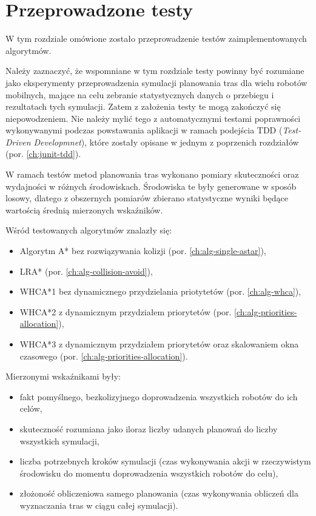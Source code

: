 \chapter{Przeprowadzone testy}
\label{ch:tests}
W tym rozdziale omówione zostało przeprowadzenie testów zaimplementowanych algorytmów.

Należy zaznaczyć, że wspomniane w tym rozdziale testy powinny być rozumiane jako eksperymenty przeprowadzenia symulacji planowania tras dla wielu robotów mobilnych, mające na celu zebranie statystycznych danych o przebiegu i rezultatach tych symulacji. Zatem z założenia testy te mogą zakończyć się niepowodzeniem.
Nie należy mylić tego z automatycznymi testami poprawności wykonywanymi podczas powstawania aplikacji w ramach podejścia TDD ({\it Test-Driven Developmnet}), które zostały opisane w jednym z poprzenich rozdziałów (por. \ref{ch:junit-tdd}).

W ramach testów metod planowania tras wykonano pomiary skuteczności oraz wydajności w różnych środowiskach. 
Środowiska te były generowane w sposób losowy, dlatego z obszernych pomiarów zbierano statystyczne wyniki będące wartością średnią mierzonych wskaźników.

Wśród testowanych algorytmów znalazły się:
\begin{itemize}
	\item Algorytm A* bez rozwiązywania kolizji (por. \ref{ch:alg-single-astar}),
	\item LRA* (por. \ref{ch:alg-collision-avoid}),
	\item WHCA*1 bez dynamicznego przydzielania priotytetów (por. \ref{ch:alg-whca}),
	\item WHCA*2 z dynamicznym przydziałem priorytetów (por. \ref{ch:alg-priorities-allocation}),
	\item WHCA*3 z dynamicznym przydziałem priorytetów oraz skalowaniem okna czasowego (por. \ref{ch:alg-priorities-allocation}).
\end{itemize}

Mierzonymi wskaźnikami były:
\begin{itemize}
	\item fakt pomyślnego, bezkolizyjnego doprowadzenia wszystkich robotów do ich celów,
	\item skuteczność rozumiana jako iloraz liczby udanych planowań do liczby wszystkich symulacji,
	\item liczba potrzebnych kroków symulacji (czas wykonywania akcji w rzeczywistym środowisku do momentu doprowadzenia wszystkich robotów do celu),
	\item złożoność obliczeniowa samego planowania (czas wykonywania obliczeń dla wyznaczania tras w ciągu całej symulacji).
\end{itemize}


